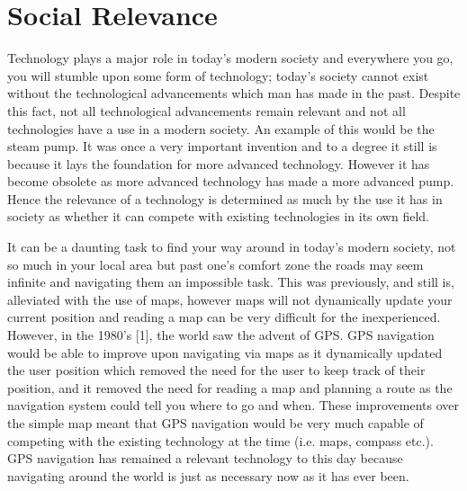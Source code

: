 \section{Social Relevance}



Technology plays a major role in today's modern society and everywhere you go, you will stumble upon some form of technology; today's society cannot exist without the technological advancements which man has made in the past. Despite this fact, not all technological advancements remain relevant and not all technologies have a use in a modern society. An example of this would be the steam pump. It was once a very important invention and to a degree it still is because it lays the foundation for more advanced technology. However it has become obsolete as more advanced technology has made a more advanced pump. Hence the relevance of a technology is determined as much by the use it has in society as whether it can compete with existing technologies in its own field.

It can be a daunting task to find your way around in today's modern society, not so much in your local area but past one's comfort zone the roads may seem infinite and navigating them an impossible task. This was previously, and still is, alleviated with the use of maps, however maps will not dynamically update your current position and reading a map can be very difficult for the inexperienced. However, in the 1980's [1], the world saw the advent of GPS. GPS navigation would be able to improve upon navigating via maps as it dynamically updated the user position which removed the need for the user to keep track of their position, and it removed the need for reading a map and planning a route as the navigation system could tell you where to go and when. These improvements over the simple map meant that GPS navigation would be very much capable of competing with the existing technology at the time (i.e. maps, compass etc.). GPS navigation has remained a relevant technology to this day because navigating around the world is just as necessary now as it has ever been.

